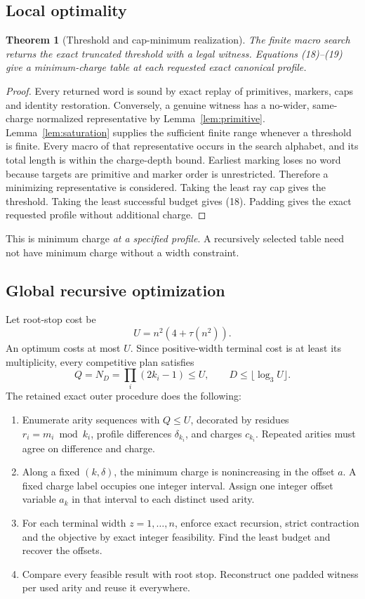 \documentclass[11pt,letterpaper]{article}
\newtheorem{theorem}{Theorem}[section]
\begin{document}
\subsection{Local optimality}
\begin{theorem}[Threshold and cap-minimum realization]
The finite macro search returns the exact truncated threshold with
a legal witness. Equations (18)--(19) give a minimum-charge table
at each requested exact canonical profile.
\end{theorem}
\begin{proof}
Every returned word is sound by exact replay of primitives, markers,
caps and identity restoration. Conversely, a genuine witness has a
no-wider, same-charge normalized representative by
Lemma~\ref{lem:primitive}. Lemma~\ref{lem:saturation} supplies the
sufficient finite range whenever a threshold is finite.
Every macro of that representative occurs in the search alphabet,
and its total length is within the charge-depth bound.
Earliest marking loses no word because targets are primitive and
marker order is unrestricted. Therefore a minimizing representative
is considered. Taking the least ray cap gives the threshold.
Taking the least successful budget gives (18).
Padding gives the exact requested profile without additional charge.
\end{proof}
This is minimum charge \emph{at a specified profile}. A recursively
selected table need not have minimum charge without a width constraint.

\subsection{Global recursive optimization}
Let root-stop cost be
\[
U=n^2(4+\tau(n^2)).
\tag{20}
\]
An optimum costs at most \(U\). Since positive-width terminal cost
is at least its multiplicity, every competitive plan satisfies
\[
Q=N_D=\prod_i(2k_i-1)\le U,\qquad
D\le\lfloor\log_3 U\rfloor.
\tag{21}
\]
The retained exact outer procedure \cite{outer} does the following:
\begin{enumerate}
\item Enumerate arity sequences with \(Q\le U\), decorated by residues
\(r_i=m_i\bmod k_i\), profile differences \(\delta_{k_i}\), and charges
\(c_{k_i}\). Repeated arities must agree on difference and charge.
\item Along a fixed \((k,\delta)\), the minimum charge is nonincreasing
in the offset \(a\). A fixed charge label occupies one integer interval.
Assign one integer offset variable \(a_k\) in that interval to each
distinct used arity.
\item For each terminal width \(z=1,\ldots,n\), enforce exact recursion,
strict contraction and the objective by exact integer feasibility.
Find the least budget and recover the offsets.
\item Compare every feasible result with root stop.
Reconstruct one padded witness per used arity and reuse it everywhere.
\end{enumerate}
\end{document}
